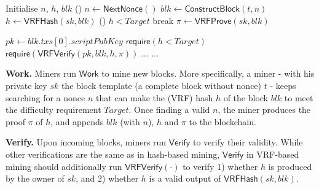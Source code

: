 \documentclass[a0,portrait]{a0poster}
\begin{document}
\begin{multicols}{2}
    \vspace{1cm}
    \begin{algorithm}[H]
        \caption{$\mathsf{Work}(sk, t, Target)$.}
        \label{algo:work}
        \SetAlgoLined\DontPrintSemicolon
        Initialise $n$, $h$, $blk$ 
        \While () {$n \gets \mathsf{NextNonce}()$}{
            $blk \gets \mathsf{ConstructBlock}(t, n)$ 
            $h \gets \mathsf{VRFHash}(sk, blk)$ 
            \If () {$h < Target$}{
                break 
            }
        }
        $\pi \gets \mathsf{VRFProve}(sk, blk)$ 
         
    \end{algorithm}


    \begin{algorithm}[H]
        \caption{$\mathsf{Verify}(blk, h, \pi, Target)$}
        \label{algo:verify}
        \SetAlgoLined\DontPrintSemicolon
        $pk \gets blk . txs[0] . scriptPubKey$ 
        $\mathsf{require}(h < Target)$ 
        $\mathsf{require}(\mathsf{VRFVerify}(pk, blk, h, \pi))$ \;
        $\dots$ 
        $\dots$ 
    \end{algorithm}
    \vspace{1cm}

    \textbf{Work.}
    Miners run $\mathsf{Work}$ to mine new blocks.
    More specifically, a miner - with his private key $sk$ the block template (a complete block without nonce) $t$ - keeps searching for a nonce $n$ that can make the (VRF) hash $h$ of the block $blk$ to meet the difficulty requirement $Target$.
    Once finding a valid $n$, the miner produces the proof $\pi$ of $h$, and appends $blk$ (with $n$), $h$ and $\pi$ to the blockchain.

    \textbf{Verify.}
    Upon incoming blocks, miners run $\mathsf{Verify}$ to verify their validity.
    While other verifications are the same as in hash-based mining, $\mathsf{Verify}$ in VRF-based mining should additionally run $\mathsf{VRFVerify}(\cdot)$ to verify 1) whether $h$ is produced by the owner of $sk$, and 2) whether $h$ is a valid output of $\mathsf{VRFHash}(sk, blk)$.


\end{multicols}
\end{document}
